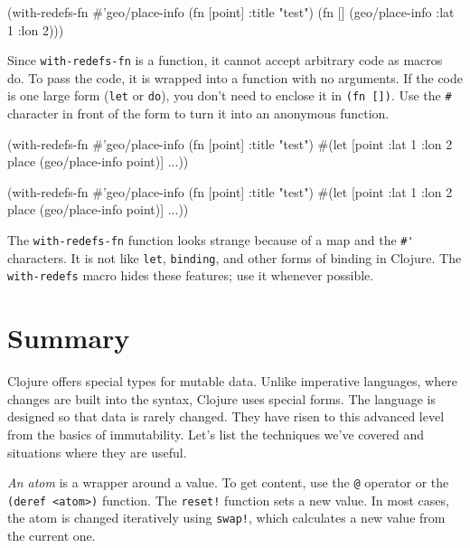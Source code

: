 \else

\begin{clojure}
(with-redefs-fn
  {#'geo/place-info (fn [point] {:title "test"})}
  (fn []
    (geo/place-info {:lat 1 :lon 2})))
\end{clojure}

\fi


Since \verb|with-redefs-fn| is a function, it cannot accept arbitrary code as macros do.
To pass the code, it is wrapped into a function with no arguments.
If the code is one large form (\verb|let| or \verb|do|), you don't need to enclose it in \verb|(fn [])|.
Use the \verb|#| character in front of the form to turn it into an anonymous function.

\ifx\DEVICETYPE\MOBILE

\begin{clojure}
(with-redefs-fn
  {#'geo/place-info (fn [point]
                      {:title "test"})}
  #(let [point {:lat 1 :lon 2}
         place (geo/place-info point)]
     ...))
\end{clojure}

\else

\begin{clojure}
(with-redefs-fn
  {#'geo/place-info (fn [point] {:title "test"})}
  #(let [point {:lat 1 :lon 2}
         place (geo/place-info point)]
     ...))
\end{clojure}

\fi

The \verb|with-redefs-fn| function looks strange because of a map and the \verb|#'| characters.
It is not like \verb|let|, \verb|binding|, and other forms of binding in Clojure.
The \verb|with-redefs| macro hides these features; use it whenever possible.

\section{Summary}

Clojure offers special types for mutable data.
Unlike imperative languages, where changes are built into the syntax, Clojure uses special forms.
The language is designed so that data is rarely changed.
They have risen to this advanced level from the basics of immutability.
Let's list the techniques we've covered and situations where they are useful.

\emph{An atom} is a wrapper around a value.
To get content, use the \verb|@| operator or the \verb|(deref <atom>)| function.
The \verb|reset!| function sets a new value.
In most cases, the atom is changed iteratively using \verb|swap!|, which calculates a new value from the current one.

